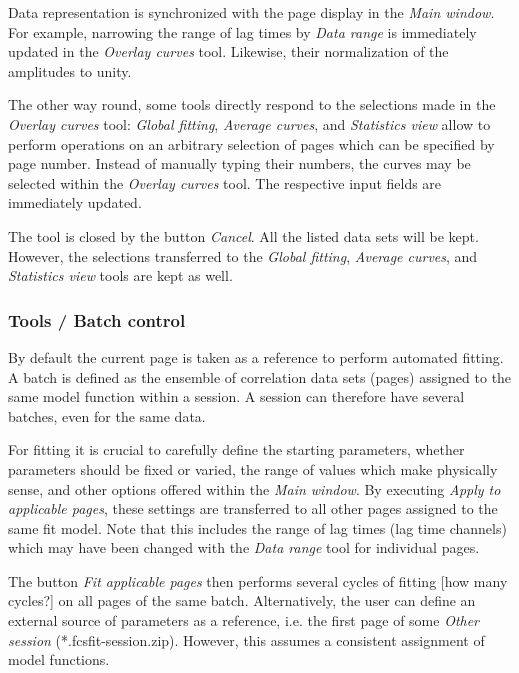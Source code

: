 Data representation is synchronized with the page display in the \textit{Main window}. For example, narrowing the range of lag times by \textit{Data range }is immediately updated in the \textit{Overlay curves }tool. Likewise, their normalization of the amplitudes to unity.

The other way round, some tools directly respond to the selections made in the \textit{Overlay curves} tool: \textit{Global fitting}, \textit{Average curves}, and \textit{Statistics view} allow to perform operations on an arbitrary selection of pages which can be specified by page number. Instead of manually typing their numbers, the curves may be selected within the \textit{Overlay curves} tool. The respective input fields are immediately updated.

The tool is closed by the button \textit{Cancel}. All the listed data sets will be kept. However, the selections transferred to the \textit{Global fitting}, \textit{Average curves}, and \textit{Statistics view} tools are kept as well.

\subsubsection{Tools / Batch control}
\label{sec:menub.tools.batch}
By default the current page is taken as a reference to perform automated fitting. A batch is defined as the ensemble of correlation data sets (pages) assigned to the same model function within a session. A session can therefore have several batches, even for the same data. 

For fitting it is crucial to carefully define the starting parameters, whether parameters should be fixed or varied, the range of values which make physically sense, and other options offered within the \textit{Main window}. By executing \textit{Apply to applicable pages}, these settings are transferred to all other pages assigned to the same fit model. Note that this includes the range of lag times (lag time channels) which may have been changed with the \textit{Data range }tool for individual pages.

The button \textit{Fit applicable pages} then performs several cycles of fitting [how many cycles?] on all pages of the same batch. Alternatively, the user can define an external source of parameters as a reference, i.e. the first page of some \textit{Other session} (*.fcsfit-session.zip). However, this assumes a consistent assignment of model functions.

